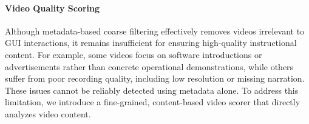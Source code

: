 \documentclass{llmxive}
\providecommand{\lilei}[1]{#1 -lilei}
\begin{document}

\paragraph{Video Quality Scoring}
Although metadata-based coarse filtering effectively removes videos irrelevant to GUI interactions, it remains insufficient for ensuring high-quality instructional content. For example, some videos focus on software introductions or advertisements rather than concrete operational demonstrations, while others suffer from poor recording quality, including low resolution or missing narration. These issues cannot be reliably detected using metadata alone. To address this limitation, we introduce a fine-grained, content-based video scorer that directly analyzes video content.

\end{document}
